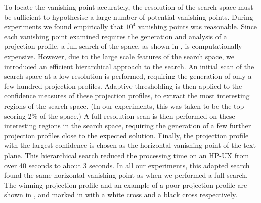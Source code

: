 To locate the vanishing point accurately, the resolution of the
search space must be sufficient to hypothesise a large number of potential
vanishing points.  During experiments we found empirically that $10^4$
vanishing points was reasonable. Since each vanishing point examined requires
the generation and analysis of a projection profile, a full search of the
space, as shown in , is computationally expensive.  However, due
to the large scale features of the search space, we introduced an efficient
hierarchical approach to the search.  An initial scan of the search space at a
low resolution is performed, requiring the generation of only a few hundred
projection profiles.  Adaptive thresholding is then applied to the confidence
measures of these projection profiles, to extract the most interesting regions
of the search space.  (In our experiments, this was taken to be the top scoring
2\% of the space.) A full resolution scan is then performed on these
interesting regions in the search space, requiring the generation of a few
further projection profiles close to the expected solution.  Finally, the
projection profile with the largest confidence is chosen as the horizontal
vanishing point of the text plane.  
This hierarchical search reduced the processing time on an HP-UX from over 40
seconds to about 3 seconds. In all our experiments, this adapted search found
the same horizontal vanishing point as when we performed a full search.
The winning projection profile and an
example of a poor projection profile are shown in , and
marked in  with a white cross and a black cross respectively.



